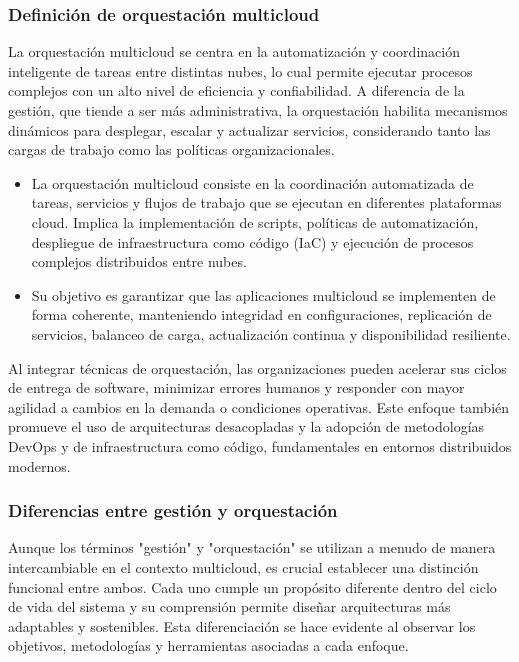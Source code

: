 {            \subsubsection{Definición de orquestación multicloud}
                La orquestación multicloud se centra en la automatización y coordinación inteligente de tareas entre distintas nubes, lo cual permite ejecutar procesos complejos con un alto nivel de eficiencia y confiabilidad. A diferencia de la gestión, que tiende a ser más administrativa, la orquestación habilita mecanismos dinámicos para desplegar, escalar y actualizar servicios, considerando tanto las cargas de trabajo como las políticas organizacionales.

                \begin{itemize}
                    \item La orquestación multicloud consiste en la coordinación automatizada de tareas, servicios y flujos de trabajo que se ejecutan en diferentes plataformas cloud. Implica la implementación de scripts, políticas de automatización, despliegue de infraestructura como código (IaC) y ejecución de procesos complejos distribuidos entre nubes.
                    \item Su objetivo es garantizar que las aplicaciones multicloud se implementen de forma coherente, manteniendo integridad en configuraciones, replicación de servicios, balanceo de carga, actualización continua y disponibilidad resiliente.
                \end{itemize}
                
                Al integrar técnicas de orquestación, las organizaciones pueden acelerar sus ciclos de entrega de software, minimizar errores humanos y responder con mayor agilidad a cambios en la demanda o condiciones operativas. Este enfoque también promueve el uso de arquitecturas desacopladas y la adopción de metodologías DevOps y de infraestructura como código, fundamentales en entornos distribuidos modernos.
                
            \subsubsection{Diferencias entre gestión y orquestación}
                Aunque los términos "gestión" y "orquestación" se utilizan a menudo de manera intercambiable en el contexto multicloud, es crucial establecer una distinción funcional entre ambos. Cada uno cumple un propósito diferente dentro del ciclo de vida del sistema y su comprensión permite diseñar arquitecturas más adaptables y sostenibles. Esta diferenciación se hace evidente al observar los objetivos, metodologías y herramientas asociadas a cada enfoque.

}
